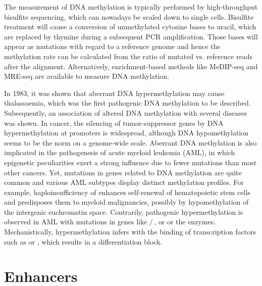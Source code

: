 The measurement of DNA methylation is typically performed by high-throughput bisulfite sequencing\cite{Meissner2005}, which can  nowadays be scaled down to single cells\cite{Mulqueen2018}. Bisulfite treatment will cause a conversion of unmethylated cytosine bases to uracil, which are replaced by thymine during a subsequent PCR amplification. Those bases will appear as mutations with regard to a reference genome and hence the methylation rate can be calculated from the ratio of mutated vs. reference reads after the alignment. Alternatively, enrichment-based methods like MeDIP-seq and MRE-seq are available to measure DNA methylation\cite{Xing2018}. 

In 1983, it was shown that aberrant DNA hypermethylation may cause thalassaemia\cite{Kioussis1983}, which was the first pathogenic DNA methylation to be described. Subsequently, an association of altered DNA methylation with several diseases was shown. In cancer, the silencing of tumor-suppressor genes by DNA hypermethylation at promoters is widespread, although DNA hypomethylation seems to be the norm on a genome-wide scale\cite{Vidal2017}. Aberrant DNA methylation is also implicated in the pathogenesis of acute myeloid leukemia (AML), in which epigenetic peculiarities exert a strong influence\cite{Eriksson2015} due to fewer mutations than most other cancers\cite{TCGAC2013}.  Yet, mutations in genes related to DNA methylation are quite common\cite{TCGAC2013} and various AML subtypes display distinct methylation profiles\cite{Figueroa2010,Akalin2012a}. For example, haploinsufficiency of  enhances self-renewal\cite{Challen2014} of hematopoietic stem cells and predisposes them to myeloid malignancies\cite{Cole2017}, possibly by hypomethylation of the intergenic euchromatin space\cite{Weinberg2019}. Contrarily, pathogenic hypermethylation is observed in AML with mutations in genes like /$\,$\cite{Im2014}, \cite{Raffel2017} or \cite{Rampal2014} or the  enzymes\cite{Lorsbach2003,Moran-Crusio2011,Solary2014}. Mechanistically,  hypermethylation infers with the binding of transcription factors such as \cite{Sonnet2014} or \tfcebpa{}, which results in a differentiation block. 

\section{Enhancers}
\label{chap:i:abridged:enhancers:enhancerdef}

